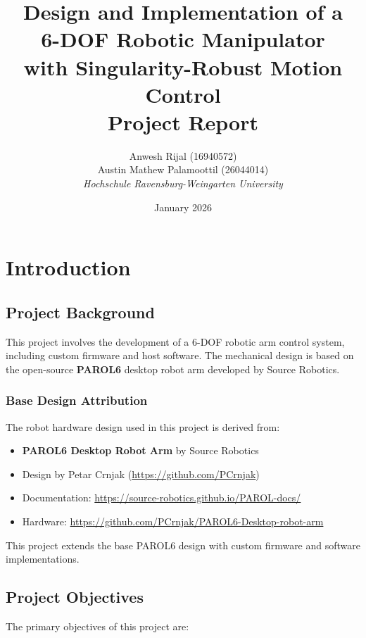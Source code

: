 \documentclass[12pt,a4paper]{report}
\title{
    \vspace{2cm}
    {\Huge\bfseries Design and Implementation of a}\\[0.3cm]
    {\Huge\bfseries 6-DOF Robotic Manipulator}\\[0.5cm]
    {\Huge\bfseries with Singularity-Robust Motion Control}\\[0.8cm]
    {\LARGE Project Report}\\
    \vspace{2cm}
}
\author{
    Anwesh Rijal (16940572) \\
    Austin Mathew Palamoottil (26044014) \\
    \textit{Hochschule Ravensburg-Weingarten University}
}
\date{
    January 2026
}
\begin{document}
\maketitle
\thispagestyle{empty}
\newpage

\tableofcontents
\newpage


\chapter{Introduction}

\section{Project Background}

This project involves the development of a 6-DOF robotic arm control system, including custom firmware and host software. The mechanical design is based on the open-source \textbf{PAROL6} desktop robot arm developed by Source Robotics.

\subsection{Base Design Attribution}

The robot hardware design used in this project is derived from:

\begin{itemize}
    \item \textbf{PAROL6 Desktop Robot Arm} by Source Robotics
    \item Design by Petar Crnjak (\url{https://github.com/PCrnjak})
    \item Documentation: \url{https://source-robotics.github.io/PAROL-docs/}
    \item Hardware: \url{https://github.com/PCrnjak/PAROL6-Desktop-robot-arm}
\end{itemize}

This project extends the base PAROL6 design with custom firmware and software implementations.

\section{Project Objectives}

The primary objectives of this project are:
\end{document}
